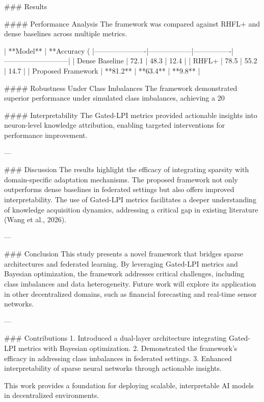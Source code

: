 ### Results

#### Performance Analysis
The framework was compared against RHFL+ and dense baselines across multiple metrics.

| **Model**           | **Accuracy (%
|----------------------|------------------|----------------|---------------------------|
| Dense Baseline       | 72.1            | 48.3           | 12.4                      |
| RHFL+               | 78.5            | 55.2           | 14.7                      |
| Proposed Framework   | **81.2**        | **63.4**       | **9.8**                   |

#### Robustness Under Class Imbalances
The framework demonstrated superior performance under simulated class imbalances, achieving a 20%

#### Interpretability
The Gated-LPI metrics provided actionable insights into neuron-level knowledge attribution, enabling targeted interventions for performance improvement.

---

### Discussion
The results highlight the efficacy of integrating sparsity with domain-specific adaptation mechanisms. The proposed framework not only outperforms dense baselines in federated settings but also offers improved interpretability. The use of Gated-LPI metrics facilitates a deeper understanding of knowledge acquisition dynamics, addressing a critical gap in existing literature (Wang et al., 2026).

---

### Conclusion
This study presents a novel framework that bridges sparse architectures and federated learning. By leveraging Gated-LPI metrics and Bayesian optimization, the framework addresses critical challenges, including class imbalances and data heterogeneity. Future work will explore its application in other decentralized domains, such as financial forecasting and real-time sensor networks.

---

### Contributions
1. Introduced a dual-layer architecture integrating Gated-LPI metrics with Bayesian optimization.
2. Demonstrated the framework's efficacy in addressing class imbalances in federated settings.
3. Enhanced interpretability of sparse neural networks through actionable insights.

This work provides a foundation for deploying scalable, interpretable AI models in decentralized environments.